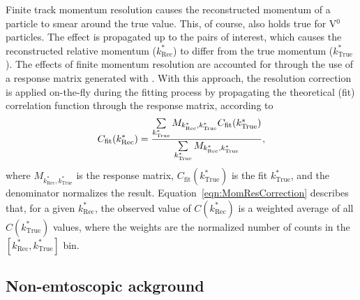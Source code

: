 \documentclass[ALICE,manyauthors]{cernphprep}
\newcommand{\ktrue}{$k^{*}_{\mathrm{True}}$\xspace}
\newcommand{\krec}{$k^{*}_{\mathrm{Rec}}$\xspace}
\newcommand{\Vz}{V$^{0}$\xspace}
\begin{document}
Finite track momentum resolution causes the reconstructed momentum of a particle to smear around the true value.
This, of course, also holds true for \Vz particles.
The effect is propagated up to the pairs of interest, which causes the reconstructed relative momentum (\krec) to differ from the true momentum (\ktrue).
The effects of finite momentum resolution are accounted for through the use of a response matrix generated with {\color{red}{MC HIJING data}} {\color{blue}{HIJING simulations}}.
With this approach, the resolution correction is applied on-the-fly during the fitting process by propagating the theoretical (fit) correlation function through the response matrix, according to
\begin{equation}
  C_{\mathrm{fit}}(k^{*}_{\mathrm{Rec}}) = \dfrac{\sum\limits_{k^{*}_{\mathrm{True}}}M_{k^{*}_{\mathrm{Rec}},k^{*}_{\mathrm{True}}}C_{\mathrm{fit}}(k^{*}_{\mathrm{True}})}{\sum\limits_{k^{*}_{\mathrm{True}}}M_{k^{*}_{\mathrm{Rec}},k^{*}_{\mathrm{True}}}}{\color{blue}{,}}
\label{eqn:MomResCorrection}
\end{equation}
where $M_{k^{*}_{\mathrm{Rec}},k^{*}_{\mathrm{True}}}$ is the response matrix, $C_{\mathrm{fit}}(k^{*}_{\mathrm{True}})$ is the fit {\color{red}{binned in}} {\color{blue}{as a function of}} \ktrue, and the denominator normalizes the result.
Equation~\ref{eqn:MomResCorrection} describes that, for a given \krec {\color{red}{bin}}, the observed value of $C(k^{*}_{\mathrm{Rec}})$ is a weighted average of all $C(k^{*}_{\mathrm{True}})$ values, where the weights are the normalized number of counts in the \mbox{$[k^{*}_{\mathrm{Rec}}, k^{*}_{\mathrm{True}}]$} bin.


\subsection{Non-{\color{red}{F}}{\color{blue}{f}}emtoscopic {\color{red}{B}}{\color{blue}{b}}ackground}
\label{NonFlatBackground}
\end{document}

